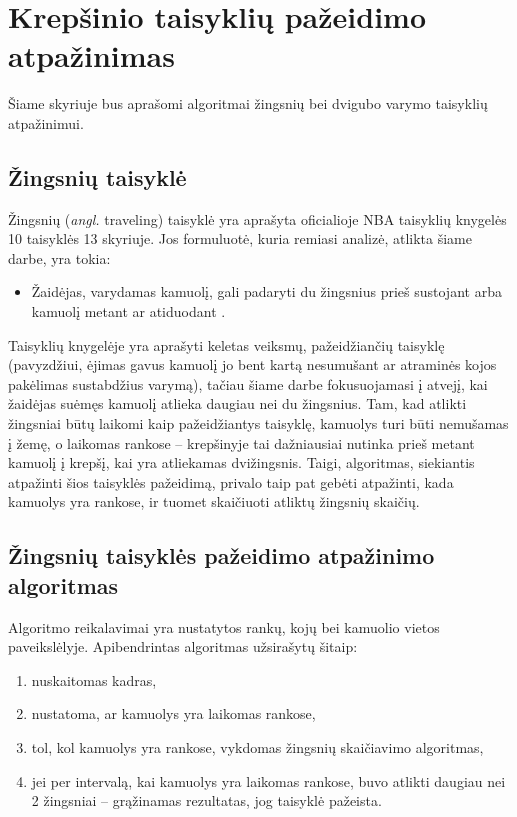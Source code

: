 \documentclass{VUMIFPSbakalaurinis}
\begin{document}
\section{Krepšinio taisyklių pažeidimo atpažinimas}

Šiame skyriuje bus aprašomi algoritmai žingsnių bei dvigubo varymo taisyklių atpažinimui.

\subsection{Žingsnių taisyklė}
Žingsnių (\textit{angl.} traveling) taisyklė yra aprašyta oficialioje NBA taisyklių knygelės 10 taisyklės 13 skyriuje. Jos formuluotė, kuria remiasi analizė, atlikta šiame darbe, yra tokia: 

\begin{itemize}
	\item Žaidėjas, varydamas kamuolį, gali padaryti du žingsnius prieš sustojant arba kamuolį metant ar atiduodant \cite{nba-rules}. 
\end{itemize}

Taisyklių knygelėje yra aprašyti keletas veiksmų, pažeidžiančių taisyklę (pavyzdžiui, ėjimas gavus kamuolį jo bent kartą nesumušant ar atraminės kojos pakėlimas sustabdžius varymą), tačiau šiame darbe fokusuojamasi į atvejį, kai žaidėjas suėmęs kamuolį atlieka daugiau nei du žingsnius. Tam, kad atlikti žingsniai būtų laikomi kaip pažeidžiantys taisyklę, kamuolys turi būti nemušamas į žemę, o laikomas rankose – krepšinyje tai dažniausiai nutinka prieš metant kamuolį į krepšį, kai yra atliekamas dvižingsnis. Taigi, algoritmas, siekiantis atpažinti šios taisyklės pažeidimą, privalo taip pat gebėti atpažinti, kada kamuolys yra rankose, ir tuomet skaičiuoti atliktų žingsnių skaičių. 

\subsection{Žingsnių taisyklės pažeidimo atpažinimo algoritmas}

Algoritmo reikalavimai yra nustatytos rankų, kojų bei kamuolio vietos paveikslėlyje. Apibendrintas algoritmas užsirašytų šitaip: 

\begin{enumerate}
	\item nuskaitomas kadras,
	\item nustatoma, ar kamuolys yra laikomas rankose,
	\item tol, kol kamuolys yra rankose, vykdomas žingsnių skaičiavimo algoritmas,
	\item jei per intervalą, kai kamuolys yra laikomas rankose, buvo atlikti daugiau nei 2 žingsniai – grąžinamas rezultatas, jog taisyklė pažeista.
\end{enumerate}
\end{document}
